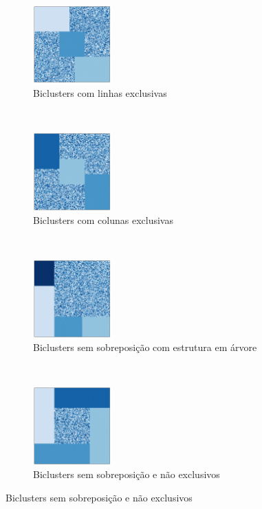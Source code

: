 \documentclass[normaltoc, espacoumemeio, pnumromarab,ruledheader]{abnt}
\begin{document}
\begin{figure}[h]
\begin{subfigure}[b]{0.3\textwidth}
                \includegraphics[width=30mm]{img/d-bic-struct.png}
                \caption{Biclusters com linhas exclusivas}
                \label{fig:bicstruct-d}
        \end{subfigure}
        ~
        \centering
        \begin{subfigure}[b]{0.3\textwidth}
                \includegraphics[width=30mm]{img/e-bic-struct.png}
                \caption{Biclusters com colunas exclusivas}
                \label{fig:bicstruct-e}
        \end{subfigure}
        ~
        \centering
        \begin{subfigure}[b]{0.3\textwidth}
                \includegraphics[width=30mm]{img/f-bic-struct.png}
                \caption{Biclusters sem sobreposição com estrutura em árvore}
                \label{fig:bicstruct-f}
        \end{subfigure}
        ~
        \centering
        \begin{subfigure}[b]{0.3\textwidth}
                \includegraphics[width=30mm]{img/g-bic-struct.png}
                \caption{Biclusters sem sobreposição e não exclusivos}
                \label{fig:bicstruct-g}
        \end{subfigure}

\end{figure}
\end{document}
